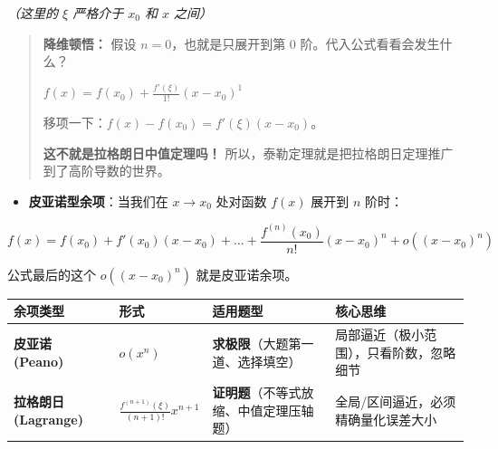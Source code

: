 \documentclass[
]{article}
\newcounter{none} %
\begin{document}
\emph{（这里的 \(\xi\) 严格介于 \(x_0\) 和 \(x\) 之间）}

\begin{quote}
\textbf{降维顿悟：} 假设 \(n=0\)，也就是只展开到第 0
阶。代入公式看看会发生什么？

\(f(x) = f(x_0) + \frac{f'(\xi)}{1!}(x-x_0)^1\)

移项一下：\(f(x) - f(x_0) = f'(\xi)(x-x_0)\)。

\textbf{这不就是拉格朗日中值定理吗！}
所以，泰勒定理就是把拉格朗日定理推广到了高阶导数的世界。
\end{quote}

\begin{itemize}
\item
  \textbf{皮亚诺型余项}：当我们在 \(x \to x_0\) 处对函数 \(f(x)\) 展开到
  \(n\) 阶时：
\end{itemize}

\[f(x) = f(x_0) + f'(x_0)(x-x_0) + \dots + \frac{f^{(n)}(x_0)}{n!}(x-x_0)^n + o((x-x_0)^n)\]

公式最后的这个 \textbf{\(o((x-x_0)^n)\)} 就是皮亚诺余项。

{\def\LTcaptype{none} %
\begin{longtable}[]{@{}llll@{}}
\toprule\noalign{}
\textbf{余项类型} & \textbf{形式} & \textbf{适用题型} &
\textbf{核心思维} \\
\midrule\noalign{}
\endhead
\bottomrule\noalign{}
\endlastfoot
\textbf{皮亚诺 (Peano)} & \(o(x^n)\) &
\textbf{求极限}（大题第一道、选择填空） &
局部逼近（极小范围），只看阶数，忽略细节 \\
\textbf{拉格朗日 (Lagrange)} & \(\frac{f^{(n+1)}(\xi)}{(n+1)!}x^{n+1}\)
& \textbf{证明题}（不等式放缩、中值定理压轴题） &
全局/区间逼近，必须精确量化误差大小 \\
\end{longtable}
}
\end{document}
